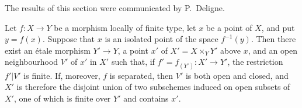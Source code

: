 The results of this section were communicated by P.~Deligne.

\begin{theorem}[18.12.1]
\label{IV.18.12.1}
Let $f:X\to Y$ be a morphism locally of finite type, let $x$ be a point of $X$, and put $y=f(x)$.
Suppose that $x$ is an isolated point of the space $f^{-1}(y)$.
Then there exist an \'etale morphism $Y'\to Y$, a point $x'$ of $X'=X\times_{Y}Y'$ above $x$, and an open neighbourhood $V'$ of $x'$ in $X'$ such that, if $f'=f_{(Y')}:X'\to Y'$, the restriction $f'|V'$ is finite.
If, moreover, $f$ is separated, then $V'$ is both open and closed, and $X'$ is therefore the disjoint union of two subschemes induced on open subsets of $X'$, one of which is finite over $Y'$ and contains $x'$.
\end{theorem}

